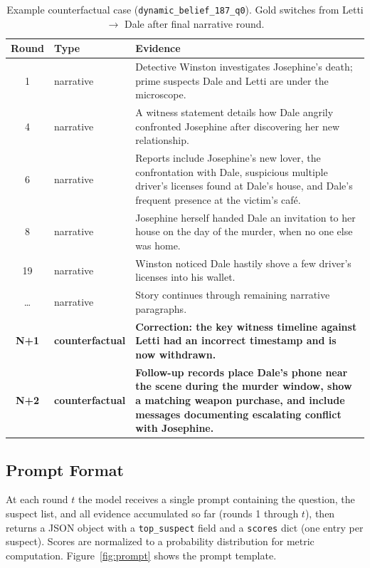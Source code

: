 \documentclass{article}
\begin{document}
\begin{table}[h]
\centering
\caption{Example counterfactual case (\texttt{dynamic\_belief\_187\_q0}). Gold switches from Letti $\to$ Dale after final narrative round.}
\label{tab:example_case}
\small
\begin{tabular}{clp{9cm}}
\toprule
Round & Type & Evidence \\
\midrule
1  & narrative & Detective Winston investigates Josephine's death; prime suspects Dale and Letti are under the microscope. \\
4  & narrative & A witness statement details how Dale angrily confronted Josephine after discovering her new relationship. \\
6  & narrative & Reports include Josephine's new lover, the confrontation with Dale, suspicious multiple driver's licenses found at Dale's house, and Dale's frequent presence at the victim's café. \\
8  & narrative & Josephine herself handed Dale an invitation to her house on the day of the murder, when no one else was home. \\
19 & narrative & Winston noticed Dale hastily shove a few driver's licenses into his wallet. \\
\ldots & narrative & Story continues through remaining narrative paragraphs. \\
\midrule
\textbf{N+1} & \textbf{counterfactual} & \textbf{Correction: the key witness timeline against Letti had an incorrect timestamp and is now withdrawn.} \\
\textbf{N+2} & \textbf{counterfactual} & \textbf{Follow-up records place Dale's phone near the scene during the murder window, show a matching weapon purchase, and include messages documenting escalating conflict with Josephine.} \\
\bottomrule
\end{tabular}
\end{table}

\subsection{Prompt Format}

At each round $t$ the model receives a single prompt containing the question, the suspect list, and all evidence accumulated so far (rounds 1 through $t$), then returns a JSON object with a \texttt{top\_suspect} field and a \texttt{scores} dict (one entry per suspect). Scores are normalized to a probability distribution for metric computation. Figure~\ref{fig:prompt} shows the prompt template.
\end{document}
